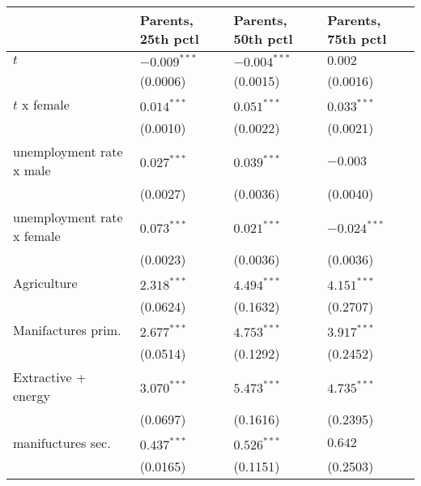 \begin{tabular}{llll}
\toprule
{} & Parents, 25th pctl & Parents, 50th pctl & Parents, 75th pctl \\
\midrule
$t$                                                &     $-0.009^{***}$ &     $-0.004^{***}$ &            $0.002$ \\
                                                   &           (0.0006) &           (0.0015) &           (0.0016) \\
$t$ x female                                       &      $0.014^{***}$ &      $0.051^{***}$ &      $0.033^{***}$ \\
                                                   &           (0.0010) &           (0.0022) &           (0.0021) \\
unemployment rate x male                           &      $0.027^{***}$ &      $0.039^{***}$ &           $-0.003$ \\
                                                   &           (0.0027) &           (0.0036) &           (0.0040) \\
unemployment rate x female                         &      $0.073^{***}$ &      $0.021^{***}$ &     $-0.024^{***}$ \\
                                                   &           (0.0023) &           (0.0036) &           (0.0036) \\
Agriculture                                        &      $2.318^{***}$ &      $4.494^{***}$ &      $4.151^{***}$ \\
                                                   &           (0.0624) &           (0.1632) &           (0.2707) \\
Manifactures prim.                                 &      $2.677^{***}$ &      $4.753^{***}$ &      $3.917^{***}$ \\
                                                   &           (0.0514) &           (0.1292) &           (0.2452) \\
Extractive + energy                                &      $3.070^{***}$ &      $5.473^{***}$ &      $4.735^{***}$ \\
                                                   &           (0.0697) &           (0.1616) &           (0.2395) \\
manifuctures sec.                                  &      $0.437^{***}$ &      $0.526^{***}$ &            $0.642$ \\
                                                   &           (0.0165) &           (0.1151) &           (0.2503) \\

\end{tabular}
